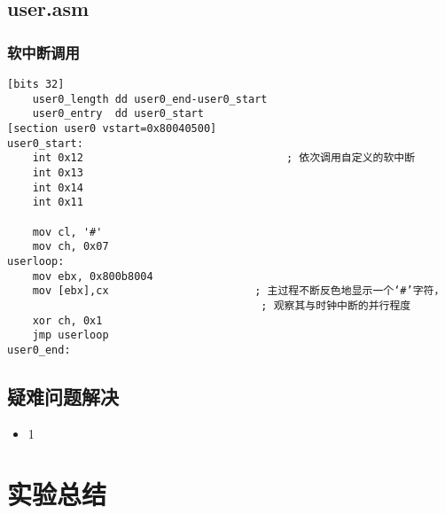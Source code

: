 \documentclass[a4paper,11pt,UTF8]{ctexart}
\newcommand{\bottomcaption}{%
\setlength{\abovecaptionskip}{6pt}%
\setlength{\belowcaptionskip}{6pt}%
\caption}
\begin{document}
	\subsection{user.asm}
		\subsubsection{软中断调用}
	\begin{lstlisting}[caption={user0 asm},tabsize=4,basicstyle=\footnotesize,captionpos=b]
[bits 32]
	user0_length dd user0_end-user0_start
	user0_entry  dd user0_start
[section user0 vstart=0x80040500]
user0_start:
	int 0x12                                ; 依次调用自定义的软中断
	int 0x13
	int 0x14
	int 0x11

	mov cl, '#'
	mov ch, 0x07
userloop:
	mov ebx, 0x800b8004
	mov [ebx],cx                       ; 主过程不断反色地显示一个‘#’字符，
										; 观察其与时钟中断的并行程度
	xor ch, 0x1
	jmp userloop
user0_end:
	\end{lstlisting}
	
			
		
	
	
		
		


\subsection{疑难问题解决}
	
	\begin{itemize}			
		\item 1
	\end{itemize}


\section{实验总结}




\clearpage
\end{document}
